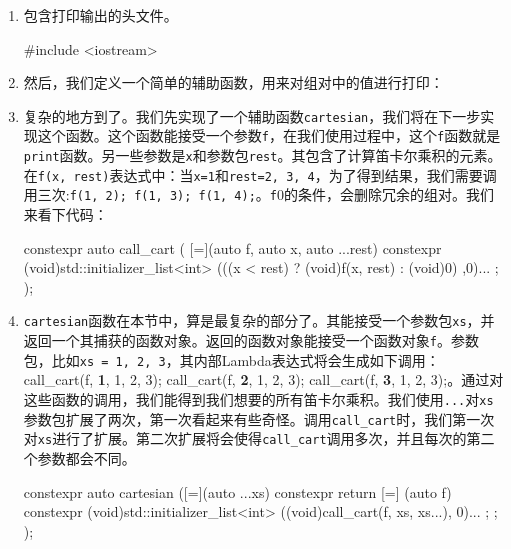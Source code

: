 \begin{enumerate}
\item 包含打印输出的头文件。

\begin{codebox}[cpp]
#include <iostream>
\end{codebox}

\item 然后，我们定义一个简单的辅助函数，用来对组对中的值进行打印：

\begin{codebox}[cpp]
static void print(int x, int y)
{
    std::cout << "(" << x << ", " << y << ")\n";
}
int main()
{
\end{codebox}

\item 复杂的地方到了。我们先实现了一个辅助函数\texttt{cartesian}，我们将在下一步实现这个函数。这个函数能接受一个参数\texttt{f}，在我们使用过程中，这个\texttt{f}函数就是\texttt{print}函数。另一些参数是\texttt{x}和参数包\texttt{rest}。其包含了计算笛卡尔乘积的元素。在\texttt{f(x, rest)}表达式中：当\texttt{x=1}和\texttt{rest=2, 3, 4}，为了得到结果，我们需要调用三次:\texttt{f(1, 2); f(1, 3); f(1, 4);}。\texttt{f}0的条件，会删除冗余的组对。我们来看下代码：

\begin{codebox}[cpp]
constexpr auto call_cart (
    [=](auto f, auto x, auto ...rest) constexpr {
        (void)std::initializer_list<int>{
            (((x < rest)
                ? (void)f(x, rest)
                : (void)0)
            ,0)...
        };
    });
\end{codebox}

\item \texttt{cartesian}函数在本节中，算是最复杂的部分了。其能接受一个参数包\texttt{xs}，并返回一个其捕获的函数对象。返回的函数对象能接受一个函数对象\texttt{f}。参数包，比如\texttt{xs = 1, 2, 3}，其内部Lambda表达式将会生成如下调用：call\_cart(f, \textbf{1}, 1, 2, 3); call\_cart(f, \textbf{2}, 1, 2, 3); call\_cart(f, \textbf{3}, 1, 2, 3);。通过对这些函数的调用，我们能得到我们想要的所有笛卡尔乘积。我们使用\texttt{...}对\texttt{xs}参数包扩展了两次，第一次看起来有些奇怪。调用\texttt{call\_cart}时，我们第一次对\texttt{xs}进行了扩展。第二次扩展将会使得\texttt{call\_cart}调用多次，并且每次的第二个参数都会不同。

\begin{codebox}[cpp]
constexpr auto cartesian ([=](auto ...xs) constexpr {
    return [=] (auto f) constexpr {
        (void)std::initializer_list<int>{
            ((void)call_cart(f, xs, xs...), 0)...
        };
    };
});
\end{codebox}


\end{enumerate}
